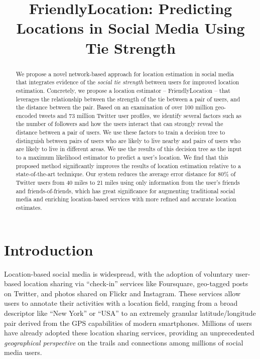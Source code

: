 \documentclass[letterpaper]{article}
\begin{document}
\title{FriendlyLocation: Predicting Locations in Social Media Using Tie Strength}

\maketitle
\begin{abstract}
We propose a novel network-based approach for location estimation in social media that integrates evidence of the \textit{social tie strength} between users for improved location estimation. Concretely, we propose a location estimator -- FriendlyLocation -- that leverages the relationship between the strength of the tie between a pair of users, and the distance between the pair.
Based on an examination of over 100 million geo-encoded tweets and 73 million
Twitter user profiles, we identify several factors such as the
number of followers and how the users interact that can strongly reveal the
distance between a pair of users.
We use these factors to train a decision
tree to distinguish between pairs of users who are likely to live nearby and pairs of
users who are likely to live in different areas.
We use the results of this decision tree as the input to a maximum likelihood estimator to predict a user's location. We find that this proposed method significantly improves the results of location estimation relative to a state-of-the-art technique. Our system reduces the average error distance for 80\% of Twitter users from 40 miles to 21 miles using only information from the user's friends and friends-of-friends,  which has great significance for augmenting traditional social media and enriching location-based services with more refined and accurate location estimates.
\end{abstract}

\section{Introduction}
Location-based social media is widespread, with the adoption of voluntary user-based location sharing via ``check-in'' services like Foursquare, geo-tagged posts on Twitter, and photos shared on Flickr and Instagram. These services allow users to annotate their activities with a location field, ranging from a broad descriptor like ``New York'' or ``USA'' to an extremely granular latitude/longitude pair  derived from the GPS capabilities of modern smartphones. Millions of users have already adopted these location sharing services, providing an unprecedented \textit{geographical perspective} on the trails and connections among millions of social media users. 
\end{document}
